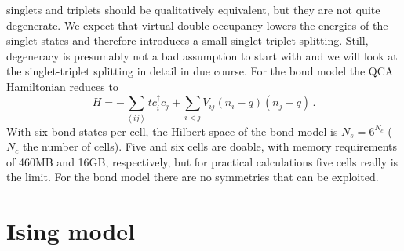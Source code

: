 singlets and triplets should be qualitatively equivalent, but they are not quite
degenerate. We expect that virtual double-occupancy lowers the energies of the
singlet states and therefore introduces a small singlet-triplet splitting.
Still, degeneracy is presumably not a bad assumption to start with and we will
look at the singlet-triplet splitting in detail in due course. For the
bond model the QCA Hamiltonian reduces to
%
\begin{equation}
  \label{eq:H_bond}
  H = - \sum_{\left<ij\right>} t c_i^{\dagger} c_j
      + \sum_{i<j} V_{ij} \left( n_i - q \right) \left( n_j - q \right) \, .
\end{equation}
%
With six bond states per cell, the Hilbert space of the bond model is
$N_s = 6^{N_c}$ ($N_c$ the number of cells). Five and six cells are doable, with
memory requirements of 460MB and 16GB, respectively, but for practical
calculations five cells really is the limit. For the bond model there are
no symmetries that can be exploited.


\section{Ising model}

